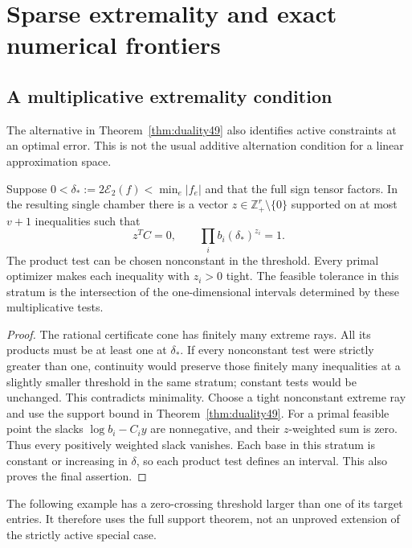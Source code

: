 \section{Sparse extremality and exact numerical frontiers}\label{sec:examples49}
\subsection{A multiplicative extremality condition}
The alternative in Theorem~\ref{thm:duality49} also identifies active
constraints at an optimal error. This is not the usual additive
alternation condition for a linear approximation space.

\begin{proposition}\label{prop:tight49}
Suppose $0<\delta_*:=2\mathcal E_2(f)<\min_e|f_e|$ and that the
full sign tensor factors. In the resulting single chamber there is
a vector $z\in\mathbb Z_+^r\setminus\{0\}$ supported on at most
$v+1$ inequalities such that
\[
 z^TC=0,\qquad \prod_i b_i(\delta_*)^{z_i}=1.
\]
The product test can be chosen nonconstant in the threshold.
Every primal optimizer makes each inequality with $z_i>0$ tight.
The feasible tolerance in this stratum is the intersection of the
one-dimensional intervals determined by these multiplicative tests.
\end{proposition}
\begin{proof}
The rational certificate cone has finitely many extreme rays. All its
products must be at least one at $\delta_*$. If every nonconstant test were strictly
greater than one, continuity would preserve those finitely many
inequalities at a slightly smaller threshold in the same stratum;
constant tests would be unchanged. This contradicts minimality.
Choose a tight nonconstant extreme ray and use the support bound in
Theorem~\ref{thm:duality49}. For a primal feasible point the slacks
$\log b_i-C_i y$ are nonnegative, and their $z$-weighted sum is zero.
Thus every positively weighted slack vanishes. Each base in this
stratum is constant or increasing in $\delta$, so each product test
defines an interval. This also proves the final assertion.
\end{proof}

The following example has a zero-crossing threshold larger than one
of its target entries. It therefore uses the full support theorem,
not an unproved extension of the strictly active special case.

